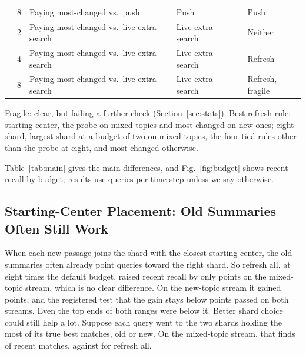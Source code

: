 \begin{table}[!t]
\begin{tabular}{@{}lclllll@{}}
 & 8 & Paying most-changed vs.\ push & \RNumAddThreeXTwoPVBEightSteadyCell{} & Push & \RNumAddThreeXTwoPVBEightNewTopicCell{} & Push \\
 & 2 & Paying most-changed vs.\ live extra search & \RNumAddThreeXTwoESOBTwoSteadyCell{} & Live extra search & \RNumAddThreeXTwoESOBTwoNewTopicCell{} & Neither \\
 & 4 & Paying most-changed vs.\ live extra search & \RNumAddThreeXTwoESOBFourSteadyCell{} & Live extra search & \RNumAddThreeXTwoESOBFourNewTopicCell{} & Refresh \\
 & 8 & Paying most-changed vs.\ live extra search & \RNumAddThreeXTwoESOBEightSteadyCell{} & Live extra search & \RNumAddThreeXTwoESOBEightNewTopicCell{} & Refresh, fragile \\
\bottomrule
\end{tabular}

\vspace{3pt}
\parbox{\textwidth}{\footnotesize Fragile: clear, but failing a further check (Section~\ref{sec:stats}). Best refresh rule: starting-center, the probe on mixed topics and most-changed on new ones; eight-shard, largest-shard at a budget of two on mixed topics, the four tied rules other than the probe at eight, and most-changed otherwise.}
\end{table}

Table~\ref{tab:main} gives the main differences, and Fig.~\ref{fig:budget} shows recent recall by budget; results use \RNumPlainQueriesDefault{} queries per time step unless we say otherwise.

\subsection{Starting-Center Placement: Old Summaries Often Still Work}
\label{sec:res-near}

When each new passage joins the shard with the closest starting center, the old summaries often already point queries toward the right shard.
So refresh all, at eight times the default budget, raised recent recall by only \RNumPlainHOneSteady{} points on the mixed-topic stream, which is no clear difference.
On the new-topic stream it gained \RNumPlainHOneNewTopic{} points, and the registered test that the gain stays below \RNumPlainGateThreshold{} points passed on both streams.
Even the top ends of both ranges were below it.
Better shard choice could still help a lot.
Suppose each query went to the two shards holding the most of its \RNumPlainTopK{} true best matches, old or new.
On the mixed-topic stream, that finds \RNumPlainOracleMOneSteadyPct{} of recent matches, against \RNumPlainLvlMOneAFSteady{} for refresh all.

